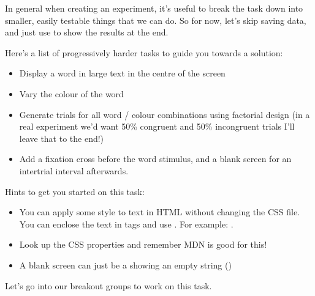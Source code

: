 \documentclass[letterpaper,10pt,english]{sphinxmanual}
\begin{document}
In general when creating an experiment,
it’s useful to break the task down into smaller, easily testable things that we
can do. So for now, let’s skip saving data, and just use
 to show the results at the end.

Here’s a list of progressively harder tasks to guide you towards a solution:
\begin{itemize}
\item {} 
Display a word in large text in the centre of the screen

\item {} 
Vary the colour of the word

\item {} 
Generate trials for all word / colour combinations using factorial design
(in a real experiment we’d want 50\% congruent and 50\% incongruent trials \textendash{}
I’ll leave that to the end!)

\item {} 
Add a fixation cross before the word stimulus, and a blank screen for an
inter\sphinxhyphen{}trial interval afterwards.

\end{itemize}

Hints to get you started on this task:
\begin{itemize}
\item {} 
You can apply some style to text in HTML without changing the CSS file. You
can enclose the text in tags and use . For example:
.

\item {} 
Look up the CSS properties  and  \textendash{} remember MDN is
good for this!

\item {} 
A blank screen can just be a  showing an empty
string ()

\end{itemize}

\begin{sphinxShadowBox}

Let’s go into our breakout groups to work on this task.
\end{sphinxShadowBox}
\end{document}
